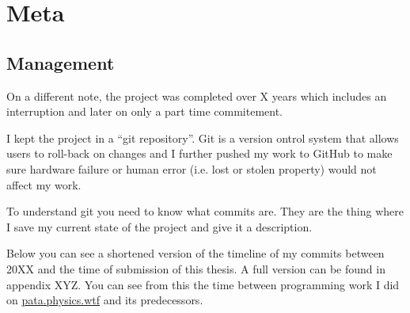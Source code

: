 \section{Meta}

\subsection{Management}

On a different note, the project was completed over X years which includes an interruption and later on only a part time commitement.

I kept the project in a ``git repository''. Git is a version ontrol system that allows users to roll-back on changes and I further pushed my work to GitHub to make sure hardware failure or human error (i.e. lost or stolen property) would not affect my work. 

To understand git you need to know what commits are. They are the thing where I save my current state of the project and give it a description.

Below you can see a shortened version of the timeline of my commits between 20XX and the time of submission of this thesis. A full version can be found in appendix XYZ. You can see from this the time between programming work I did on \url{pata.physics.wtf} and its predecessors.


